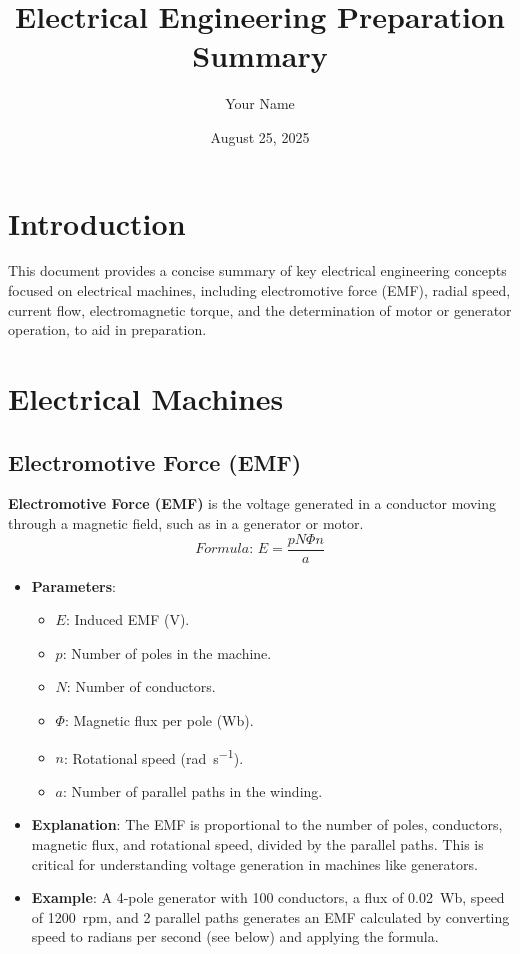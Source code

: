 \documentclass[12pt]{article}
\newcommand{\concept}[1]{\textbf{#1}}
\newcommand{\formula}[1]{\textit{Formula: }#1}
\begin{document}
\title{Electrical Engineering Preparation Summary}
\author{Your Name}
\date{August 25, 2025}
\maketitle

\tableofcontents
\newpage

\section{Introduction}
This document provides a concise summary of key electrical engineering concepts focused on electrical machines, including electromotive force (EMF), radial speed, current flow, electromagnetic torque, and the determination of motor or generator operation, to aid in preparation.

\section{Electrical Machines}
\subsection{Electromotive Force (EMF)}
\concept{Electromotive Force (EMF)} is the voltage generated in a conductor moving through a magnetic field, such as in a generator or motor.
\[
\formula{E = \frac{p N \Phi n}{a}}
\]
\begin{itemize}
    \item \textbf{Parameters}:
        \begin{itemize}
            \item \(E\): Induced EMF (\si{\volt}).
            \item \(p\): Number of poles in the machine.
            \item \(N\): Number of conductors.
            \item \(\Phi\): Magnetic flux per pole (\si{\weber}).
            \item \(n\): Rotational speed (\si{\radian\per\second}).
            \item \(a\): Number of parallel paths in the winding.
        \end{itemize}
    \item \textbf{Explanation}: The EMF is proportional to the number of poles, conductors, magnetic flux, and rotational speed, divided by the parallel paths. This is critical for understanding voltage generation in machines like generators.
    \item \textbf{Example}: A 4-pole generator with 100 conductors, a flux of \SI{0.02}{\weber}, speed of \SI{1200}{rpm}, and 2 parallel paths generates an EMF calculated by converting speed to radians per second (see below) and applying the formula.
\end{itemize}
\end{document}
